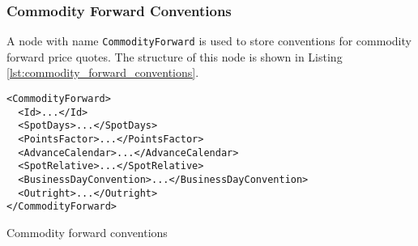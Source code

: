 \subsubsection{Commodity Forward Conventions}
A node with name \lstinline!CommodityForward! is used to store conventions for commodity forward price quotes. The
structure of this node is shown in Listing \ref{lst:commodity_forward_conventions}.

\begin{listing}[H]
\begin{verbatim}
<CommodityForward>
  <Id>...</Id>
  <SpotDays>...</SpotDays>
  <PointsFactor>...</PointsFactor>
  <AdvanceCalendar>...</AdvanceCalendar>
  <SpotRelative>...</SpotRelative>
  <BusinessDayConvention>...</BusinessDayConvention>
  <Outright>...</Outright>
</CommodityForward>
\end{verbatim}
\caption{Commodity forward conventions}
\label{lst:commodity_forward_conventions}
\end{listing}

